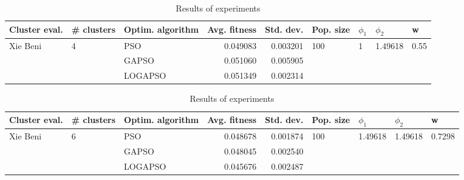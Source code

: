 \documentclass{article}
\begin{document}
\begin{table}
\centering
\caption{Results of experiments}
\begin{tabular}{lllrrllll}
\toprule
            Cluster eval. &        \# clusters & Optim. algorithm &  Avg. fitness &  Std. dev. &            Pop. size &         $\phi_{1}$ &               $\phi_{2}$ &                     w \\
\midrule
\multirow{3}{*}{Xie Beni} & \multirow{3}{*}{4} &              PSO &      0.049083 &   0.003201 & \multirow{3}{*}{100} & \multirow{3}{*}{1} & \multirow{3}{*}{1.49618} & \multirow{3}{*}{0.55} \\
                          &                    &            GAPSO &      0.051060 &   0.005905 &                      &                    &                          &                       \\
                          &                    &          LOGAPSO &      0.051349 &   0.002314 &                      &                    &                          &                       \\
\bottomrule
\end{tabular}
\end{table}
\begin{table}
\centering
\caption{Results of experiments}
\begin{tabular}{lllrrllll}
\toprule
            Cluster eval. &        \# clusters & Optim. algorithm &  Avg. fitness &  Std. dev. &            Pop. size &               $\phi_{1}$ &               $\phi_{2}$ &                       w \\
\midrule
\multirow{3}{*}{Xie Beni} & \multirow{3}{*}{6} &              PSO &      0.048678 &   0.001874 & \multirow{3}{*}{100} & \multirow{3}{*}{1.49618} & \multirow{3}{*}{1.49618} & \multirow{3}{*}{0.7298} \\
                          &                    &            GAPSO &      0.048045 &   0.002540 &                      &                          &                          &                         \\
                          &                    &          LOGAPSO &      0.045676 &   0.002487 &                      &                          &                          &                         \\
\bottomrule
\end{tabular}
\end{table}
\end{document}
